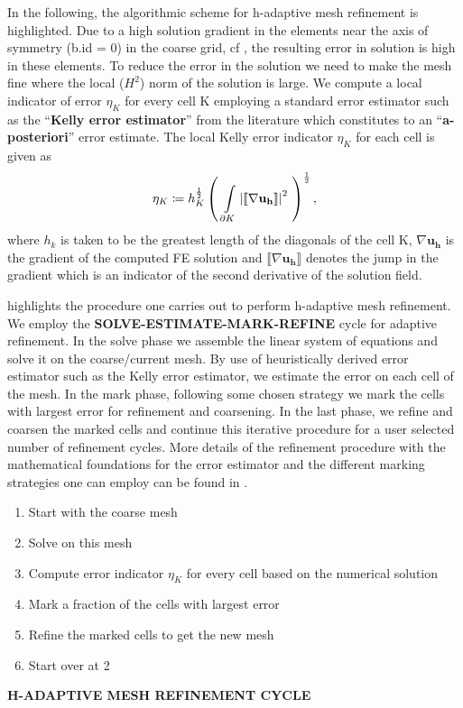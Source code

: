 In the following, the algorithmic scheme for h-adaptive mesh refinement is highlighted. Due to a high solution gradient in the elements near the axis of symmetry (b.id = 0) in the coarse grid, cf , the resulting error in solution is high in these elements. To reduce the error in the solution we need to make the mesh fine where the local ($H^2$) norm of the solution is large. We compute a local indicator of error $\eta_K$ for every cell K employing a standard error estimator such as the ``\textbf{Kelly error estimator}'' from the literature \cite{Kelly1983} which constitutes to an ``\textbf{a-posteriori}'' error estimate. The local Kelly error indicator $\eta_K$ for each cell is given as 
\begin{equation}
\eta_K \coloneqq h_K^{\frac{1}{2}} \left( \ \int\limits_{\partial K} \seminorm{{\llbracket\nabla \mathbf{u_h} \rrbracket}}^2 \ \right)^{\frac{1}{2}},
\label{eq:2.27}
\end{equation}
where $h_k$ is taken to be the greatest length of the diagonals of the cell K, $\nabla \mathbf{u_h}$ is the gradient of the computed FE solution and $\llbracket\nabla \mathbf{u_h} \rrbracket$ denotes the jump in the gradient which is an indicator of the second derivative of the solution field. \par 

 highlights the procedure one carries out to perform h-adaptive mesh refinement. We employ the \textbf{SOLVE-ESTIMATE-MARK-REFINE} cycle for adaptive refinement. In the solve phase we assemble the linear system of equations and solve it on the coarse/current mesh. By use of heuristically derived error estimator such as the Kelly error estimator, we estimate the error on each cell of the mesh. In the mark phase, following some chosen strategy we mark the cells with largest error for refinement and coarsening. In the last phase, we refine and coarsen the marked cells and continue this iterative procedure for a user selected number of refinement cycles. More details of the refinement procedure with the mathematical foundations for the error estimator and the different marking strategies one can employ can be found in \cite[Chapter 4]{Gholap_project}. \par 

\begin{algorithm}[h]
\begin{enumerate}
\item Start with the coarse mesh
\item Solve on this mesh
\item Compute error indicator $\eta_K$ for every cell based on the numerical solution
\item Mark a fraction of the cells with largest error
\item Refine the marked cells to get the new mesh
\item Start over at 2
\end{enumerate}
\caption{\textbf{H-ADAPTIVE MESH REFINEMENT CYCLE}}
\label{alg:2.2} 
\end{algorithm}

